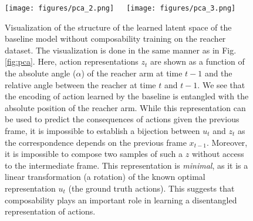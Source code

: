 \documentclass{article} %
\begin{document}
\begin{figure}
  \texttt{[image: figures/pca\_2.png]}~~~\texttt{[image: figures/pca\_3.png]}\vspace{-19pt}
  \caption{Visualization of the structure of the learned latent space of the baseline model without composability training on the reacher dataset. The visualization is done in the same manner as in Fig. \ref{fig:pca}. Here, action representations $z_t$ are shown as a function of the absolute angle ($\alpha$) of the reacher arm at time $t-1$  and the relative angle between the reacher at time $t$ and $t-1$. We see that the encoding of action learned by the baseline is entangled with the absolute position of the reacher arm. While this representation can be used to predict the consequences of actions given the previous frame, it is impossible to establish a bijection between $u_t$ and $z_t$ as the correspondence depends on the previous frame $x_{t-1}$.
  Moreover, it is impossible to compose two samples of such a $z$ without access to the intermediate frame. This representation is \textit{minimal}, as it is a linear transformation (a rotation) of the known optimal representation $u_t$ (the ground truth actions). This suggests that composability plays an important role in learning a disentangled representation of actions.}
  \label{fig:pca_app}
  \vspace{-15pt}
\end{figure}
\end{document}
